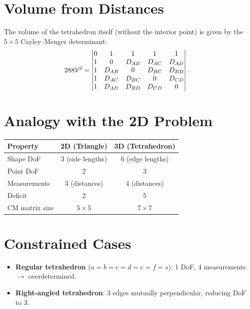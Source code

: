 \section{Volume from Distances}
The volume of the tetrahedron itself (without the interior point) is given by the $5 \times 5$ Cayley--Menger determinant:
\begin{equation}
288 \mathcal{V}^2 = \begin{vmatrix}
0 & 1 & 1 & 1 & 1 \\
1 & 0 & D_{AB} & D_{AC} & D_{AD} \\
1 & D_{AB} & 0 & D_{BC} & D_{BD} \\
1 & D_{AC} & D_{BC} & 0 & D_{CD} \\
1 & D_{AD} & D_{BD} & D_{CD} & 0
\end{vmatrix}.
\end{equation}

\section{Analogy with the 2D Problem}
\begin{table}[h!]
\centering
\begin{tabular}{lcc}
\toprule
\textbf{Property} & \textbf{2D (Triangle)} & \textbf{3D (Tetrahedron)} \\
\midrule
Shape DoF & 3 (side lengths) & 6 (edge lengths) \\
Point DoF & 2 & 3 \\
Measurements & 3 (distances) & 4 (distances) \\
Deficit & 2 & 5 \\
CM matrix size & $5 \times 5$ & $7 \times 7$ \\
\bottomrule
\end{tabular}
\end{table}

\section{Constrained Cases}
\begin{itemize}
    \item \textbf{Regular tetrahedron} ($a = b = c = d = e = f = s$): 1 DoF, 4 measurements $\to$ overdetermined.
    \item \textbf{Right-angled tetrahedron}: 3 edges mutually perpendicular, reducing DoF to 3.
\end{itemize}
